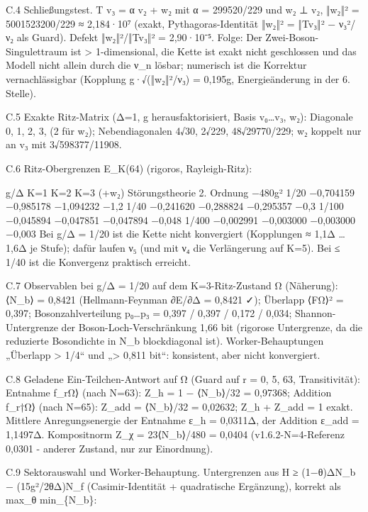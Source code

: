 C.4 Schließungstest. T v₃ = α v₂ + w₂ mit α = 299520/229 und w₂ ⊥ v₂,
‖w₂‖² = 5001523200/229 ≈ 2,184·10⁷ (exakt, Pythagoras-Identität ‖w₂‖² =
‖Tv₃‖² − ν₃²/ν₂ als Guard). Defekt ‖w₂‖²/‖Tv₃‖² = 2,90·10⁻⁵. Folge: Der
Zwei-Boson-Singulettraum ist \textgreater{} 1-dimensional, die Kette ist
exakt nicht geschlossen und das Modell nicht allein durch die ν\_n
lösbar; numerisch ist die Korrektur vernachlässigbar (Kopplung
g·√(‖w₂‖²/ν₃) = 0,195g, Energieänderung in der 6. Stelle).

C.5 Exakte Ritz-Matrix (Δ=1, g herausfaktorisiert, Basis v₀\ldots v₃,
w₂): Diagonale 0, 1, 2, 3, (2 für w₂); Nebendiagonalen 4√30, 2√229,
48√29770/229; w₂ koppelt nur an v₃ mit 3√598377/11908.

C.6 Ritz-Obergrenzen E\_K(64) (rigoros, Rayleigh-Ritz):

g/Δ K=1 K=2 K=3 (+w₂) Störungstheorie 2. Ordnung −480g² 1/20 −0,704159
−0,985178 −1,094232 −1,2 1/40 −0,241620 −0,288824 −0,295357 −0,3 1/100
−0,045894 −0,047851 −0,047894 −0,048 1/400 −0,002991 −0,003000 −0,003000
−0,003 Bei g/Δ = 1/20 ist die Kette nicht konvergiert (Kopplungen ≈ 1,1Δ
\ldots{} 1,6Δ je Stufe); dafür laufen ν₅ (und mit ν₄ die Verlängerung
auf K=5). Bei ≤ 1/40 ist die Konvergenz praktisch erreicht.

C.7 Observablen bei g/Δ = 1/20 auf dem K=3-Ritz-Zustand Ω (Näherung):
⟨N\_b⟩ = 0,8421 (Hellmann-Feynman ∂E/∂Δ = 0,8421 ✓); Überlapp
\textbar⟨F\textbar Ω⟩\textbar² = 0,397; Bosonzahlverteilung p₀\ldots p₃
= 0,397 / 0,397 / 0,172 / 0,034; Shannon-Untergrenze der
Boson-Loch-Verschränkung 1,66 bit (rigorose Untergrenze, da die
reduzierte Bosondichte in N\_b blockdiagonal ist). Worker-Behauptungen
„Überlapp \textgreater{} 1/4`` und „\textgreater{} 0,811 bit``:
konsistent, aber nicht konvergiert.

C.8 Geladene Ein-Teilchen-Antwort auf Ω (Guard auf r = 0, 5, 63,
Transitivität): Entnahme f\_r\textbar Ω⟩ (nach N=63): Z\_h = 1 −
⟨N\_b⟩/32 = 0,97368; Addition f\_r†\textbar Ω⟩ (nach N=65): Z\_add =
⟨N\_b⟩/32 = 0,02632; Z\_h + Z\_add = 1 exakt. Mittlere Anregungsenergie
der Entnahme ε\_h = 0,0311Δ, der Addition ε\_add = 1,1497Δ. Kompositnorm
Z\_χ = 23⟨N\_b⟩/480 = 0,0404 (v1.6.2-N=4-Referenz 0,0301 - anderer
Zustand, nur zur Einordnung).

C.9 Sektorauswahl und Worker-Behauptung. Untergrenzen aus H ≥ (1−θ)ΔN\_b
− (15g²/2θΔ)N\_f (Casimir-Identität + quadratische Ergänzung), korrekt
als max\_θ min\_\{N\_b\}:

